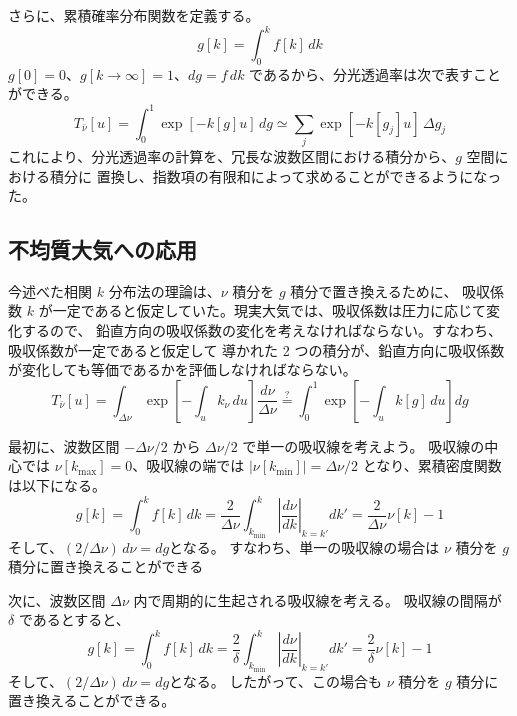 \documentclass[book]{dennou777}
\newcommand{\hmeqq}{\stackrel{\mathrm{?}}{=}}
\begin{document}
さらに、累積確率分布関数を定義する。
\begin{equation}
	g[k]=\int^k_0 f[k]\,dk
\end{equation}
\(g[0]=0\)、\(g[k\to\infty]=1\)、\(dg=f\,dk\) であるから、分光透過率は次で表すことができる。
\begin{equation}
	T_{\bar\nu}[u]=\int^1_0 \exp[-k[g]u]\,dg\simeq\sum_j\exp[-k[g_j]u]\,\Delta g_j
\end{equation}
これにより、分光透過率の計算を、冗長な波数区間における積分から、\(g\) 空間における積分に
置換し、指数項の有限和によって求めることができるようになった。

\subsection{不均質大気への応用}
今述べた相関 \(k\) 分布法の理論は、\(\nu\) 積分を \(g\) 積分で置き換えるために、
吸収係数 \(k\) が一定であると仮定していた。現実大気では、吸収係数は圧力に応じて変化するので、
鉛直方向の吸収係数の変化を考えなければならない。すなわち、吸収係数が一定であると仮定して
導かれた 2 つの積分が、鉛直方向に吸収係数が変化しても等価であるかを評価しなければならない。
\begin{equation}
	T_{\bar\nu}[u]
	=\int_{\Delta\nu}\exp\left[-\int_u k_\nu\,du\right]\frac{d\nu}{\Delta\nu}
	\hmeqq\int^1_0\exp\left[-\int_uk[g]\,du\right]dg
\end{equation}

最初に、波数区間 \(-\Delta\nu/2\) から \(\Delta\nu/2\) で単一の吸収線を考えよう。
吸収線の中心では \(\nu[k_{\mathrm{max}}]=0\)、吸収線の端では
\(|\nu[k_{\mathrm{min}}]|=\Delta\nu/2\) となり、累積密度関数は以下になる。
\begin{equation}
	g[k]=\int^k_0 f[k]\,dk
	=\frac{2}{\Delta\nu}\int^k_{k_{\mathrm{min}}}\left|\frac{d\nu}{dk}\right|_{k=k'}dk'
	=\frac{2}{\Delta\nu}\nu[k]-1
\end{equation}
そして、\((2/\Delta\nu)\,d\nu=dg\)となる。
すなわち、単一の吸収線の場合は \(\nu\) 積分を \(g\) 積分に置き換えることができる

次に、波数区間 \(\Delta\nu\) 内で周期的に生起される吸収線を考える。
吸収線の間隔が \(\delta\) であるとすると、
\begin{equation}
	g[k]=\int^k_0 f[k]\,dk
	=\frac{2}{\delta}\int^k_{k_{\mathrm{min}}}\left|\frac{d\nu}{dk}\right|_{k=k'}dk'
	=\frac{2}{\delta}\nu[k]-1
\end{equation}
そして、\((2/\Delta\nu)\,d\nu=dg\)となる。
したがって、この場合も \(\nu\) 積分を \(g\) 積分に置き換えることができる。
\end{document}
